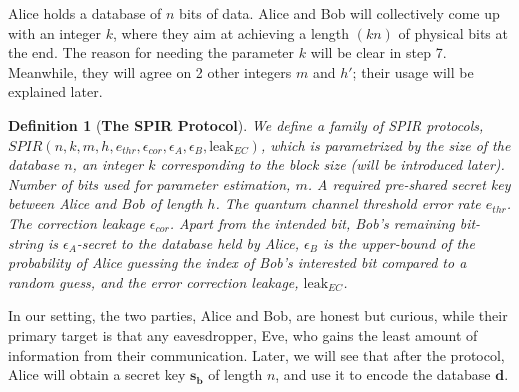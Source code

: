 \documentclass[%
 reprint,
superscriptaddress,
 amsmath,amssymb,
 aps,
]{revtex4-2}
\newtheorem{definition}{Definition}[section]
\begin{document}
Alice holds a database of $n$ bits of data. Alice and Bob will collectively come up with an integer $k$, where they aim at achieving a length $(kn)$ of physical bits at the end. The reason for needing the parameter $k$ will be clear in step 7. Meanwhile, they will agree on 2 other integers $m$ and $h'$; their usage will be explained later. 

\begin{definition}[\textbf{The SPIR Protocol}]
    We define a family of SPIR protocols, $SPIR(n, k, m, h, e_{thr}, \epsilon_{cor}, \epsilon_{A}, \epsilon_{B}, \text{leak}_{EC})$, which is parametrized by the size of the database $n$, an integer $k$ corresponding to the block size (will be introduced later). Number of bits used for parameter estimation, $m$. A required pre-shared secret key between Alice and Bob of length $h$. The quantum channel threshold error rate $e_{thr}$. The correction leakage $\epsilon_{cor}$. Apart from the intended bit, Bob's remaining bit-string is $\epsilon_A$-secret to the database held by Alice, $\epsilon_B$ is the upper-bound of the probability of Alice guessing the index of Bob's interested bit compared to a random guess, and the error correction leakage, $\text{leak}_{EC}$.
\end{definition}

In our setting, the two parties, Alice and Bob, are honest but curious, while their primary target is that any eavesdropper, Eve, who gains the least amount of information from their communication. Later, we will see that after the protocol, Alice will obtain a secret key $\mathbf{s_b}$ of length $n$, and use it to encode the database $\mathbf{d}$.
\end{document}
